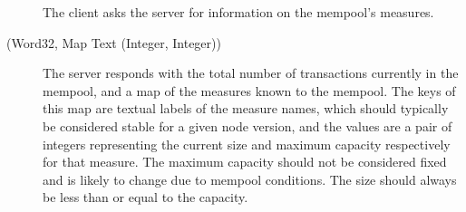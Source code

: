 \begin{description}
  \item[\MsgGetMeasures{}] The client asks the server for information on the mempool's measures.
  \item[\MsgReplyGetMeasures{} (Word32, Map Text (Integer, Integer))] The server responds with
    the total number of transactions currently in the mempool, and a map of the measures known to
    the mempool. The keys of this map are textual labels of the measure names, which should
    typically be considered stable for a given node version, and the values are a pair of integers
    representing the current size and maximum capacity respectively for that measure. The maximum
    capacity should not be considered fixed and is likely to change due to mempool conditions. The
    size should always be less than or equal to the capacity.
\end{description}


